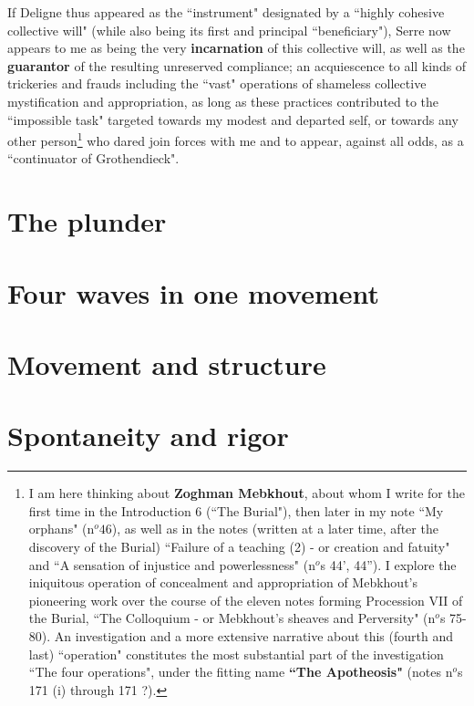If Deligne thus appeared as the ``instrument" designated by a ``highly cohesive collective will" (while also being its first and principal ``beneficiary"), Serre now appears to me as being the very \textbf{incarnation} of this collective will, as well as the \textbf{guarantor} of the resulting unreserved compliance; an acquiescence to all kinds of trickeries and frauds including the ``vast" operations of shameless collective mystification and appropriation, as long as these practices contributed to the ``impossible task" targeted towards my modest and departed self, or towards any other person\footnote{I am here thinking about \textbf{Zoghman Mebkhout}, about whom I write for the first time in the Introduction 6 (``The Burial"), then later in my note ``My orphans" (n$^o 46$), as well as in the notes (written at a later time, after the discovery of the Burial) ``Failure of a teaching (2) - or creation and fatuity" and ``A sensation of injustice and powerlessness" (n$^o$s 44', 44''). I explore the iniquitous operation of concealment and appropriation of Mebkhout's pioneering work over the course of the eleven notes forming Procession VII of the Burial, ``The Colloquium - or Mebkhout's sheaves and Perversity" (n$^o$s 75-80). An investigation and a more extensive narrative about this (fourth and last) ``operation" constitutes the most substantial part of the investigation ``The four operations", under the fitting name \textbf{``The Apotheosis"} (notes n$^o$s 171 (i) through 171 ?).} who dared join forces with me and to appear, against all odds, as a ``continuator of Grothendieck".



\section{The plunder}

\section{Four waves in one movement}

\section{Movement and structure}

\section{Spontaneity and rigor}


